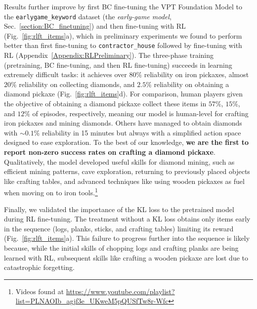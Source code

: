 Results further improve by first BC fine-tuning the VPT Foundation Model to the \texttt{earlygame\_keyword} dataset (the \emph{early-game model}, Sec.~\ref{section:BC_finetuning}) and then fine-tuning with RL (Fig.~\ref{fig:rlft_items}a), which in preliminary experiments we found to perform better than first fine-tuning to \texttt{contractor\_house} followed by fine-tuning with RL (Appendix~\ref{Appendix:RLPreliminary}).
The three-phase training (pretraining, BC fine-tuning, and then RL fine-tuning) succeeds in learning extremely difficult tasks: it achieves over $80\%$ reliability on iron pickaxes, almost $20\%$ reliability on collecting diamonds, and $2.5\%$ reliability on obtaining a diamond pickaxe (Fig.~\ref{fig:rlft_items}d). 
For comparison, human players given the objective of obtaining a diamond pickaxe collect these items in $57\%$, $15\%$, and $12\%$ of episodes, respectively, meaning our model is human-level for crafting iron pickaxes and mining diamonds.
Others have managed to obtain diamonds with $\sim0.1\%$ reliability in 15 minutes\cite{skrynnik2020forgetful, patil2020align} but always with a simplified action space designed to ease exploration. To the best of our knowledge, \textbf{we are the first to report non-zero success rates on crafting a diamond pickaxe}. Qualitatively, the model developed useful skills for diamond mining, such as efficient mining patterns, cave exploration, returning to previously placed objects like crafting tables, and advanced techniques like using wooden pickaxes as fuel when moving on to iron tools.\footnote{Videos found at \href{https://www.youtube.com/playlist?list=PLNAOIb\_agjf3e\_UKweM5pQUSfTw8r-Wfc}{https://www.youtube.com/playlist?list=PLNAOIb\_agjf3e\_UKweM5pQUSfTw8r-Wfc}}

Finally, we validated the importance of the KL loss to the pretrained model during RL fine-tuning. The treatment without a KL loss obtains only items early in the sequence (logs, planks, sticks, and crafting tables) limiting its reward (Fig.~\ref{fig:rlft_items}a).
This failure to progress further into the sequence is likely because, while the initial skills of chopping logs and crafting planks are being learned with RL, subsequent skills like crafting a wooden pickaxe are lost due to catastrophic forgetting.
